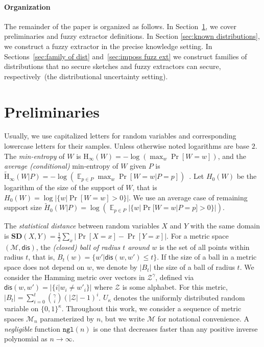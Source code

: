 \documentclass[11pt]{article}
\newcommand{\secref}[1]{\mbox{Section~\ref{#1}}}
\DeclareMathOperator*{\expe}{\mathbb{E}}
\newcommand{\dis}{\ensuremath{\mathsf{dis}}}
\newcommand{\ngl}{\ensuremath{\mathtt{ngl}}\xspace}
\newcommand{\Hoo}{\mathrm{H}_\infty}
\newcommand{\Hav}{\tilde{\mathrm{H}}_\infty}
\newcommand{\sd}{\ensuremath{\mathbf{SD}}}
\begin{document}
\paragraph{Organization} The remainder of the paper is organized as follows.  In \secref{sec:preliminaries}, we cover preliminaries and fuzzy extractor definitions.  In Section \ref{sec:known distributions}, we construct a fuzzy extractor in the precise knowledge setting.  In Sections~\ref{sec:family of dist} and~\ref{sec:imposs fuzz ext} we construct families of distributions that no secure sketches and fuzzy extractors can secure, respectively~(the distributional uncertainty setting).


\section{Preliminaries}
\label{sec:preliminaries}
Usually, we use capitalized letters for random variables and corresponding lowercase letters for their samples.
 Unless otherwise noted logarithms are base $2$.
The {\em min-entropy} of $W$ is $\Hoo(W) = -\log(\max_w \Pr[W=w])$,
and the {\em average (conditional)} min-entropy of $W$ given $P$ is  $\Hav(W|P) = -\log(\expe_{p\in P} \max_{w} \Pr[W=w|P=p])$~\cite[Section 2.4]{DBLP:journals/siamcomp/DodisORS08}.   Let $H_0(W)$ be the logarithm of the size of the support of $W$,  that is $H_0(W) = \log |\{w | \Pr[W=w]>0\}|$.  We use an average case of remaining support size $\tilde{H}_0(W |P) = \log ( \expe_{p\in P} |\{w | \Pr[W=w |P=p]>0\}|)$.

The {\em statistical distance} between random variables $X$ and $Y$ with the same domain is $\sd(X,Y) = \frac12 \sum_x |\Pr[X=x] - \Pr[Y=x]|$.
For a metric space $(\mathcal{M}, \dis)$, the \emph{(closed) ball of radius $t$ around $w$} is the set of all points within radius $t$, that is, $B_t(w) = \{w'| \dis(w, w')\leq t\}$.  If the size of a ball in a metric space does not depend on $w$, we denote by $|B_t|$ the size of a ball of radius $t$.  We consider the Hamming metric over vectors in $\mathcal{Z}^\gamma$, defined via $\dis(w,w') = |\{i | w_i \neq w'_i\}|$ where $\mathcal{Z}$ is some alphabet.  For this metric, $|B_t| = \sum_{i=0}^t {\gamma \choose i} (|\mathcal{Z}|-1)^i $.  $U_\kappa$ denotes the uniformly  distributed random variable on $\{0,1\}^\kappa$.  Throughout this work, we consider a sequence of metric spaces $\mathcal{M}_n$ parameterized by $n$, but we write $\mathcal{M}$ for notational convenience. A \emph{negligible} function $\ngl(n)$ is one that decreases faster than any positive inverse polynomial as $n\rightarrow \infty$.
\end{document}
